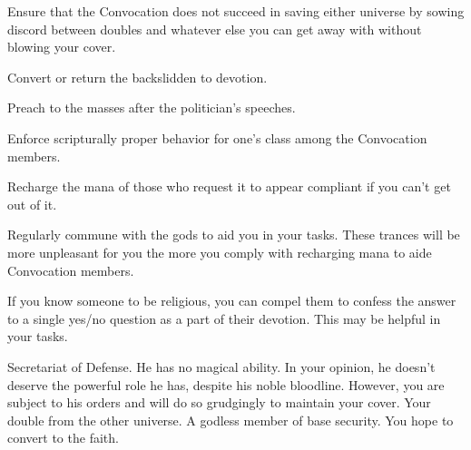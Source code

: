 \documentclass[char]{guildcamp3}
\begin{document}
\begin{itemz}[Goals]
  \item Ensure that the Convocation does not succeed in saving either universe by sowing discord between doubles and whatever else you can get away with without blowing your cover.
  \item Convert or return the backslidden to devotion.
  \item Preach to the masses after the politician's speeches.
  \item Enforce scripturally proper behavior for one's class among the Convocation members.
  \item Recharge the mana of those who request it to appear compliant if you can't get out of it.
  \item Regularly commune with the gods to aid you in your tasks. These trances will be more unpleasant for you the more you comply with recharging mana to aide Convocation members.
\end{itemz}

\begin{itemz}[Notes]
  \item If you know someone to be religious, you can compel them to confess the answer to a single yes/no question as a part of their devotion. This may be helpful in your tasks.
\end{itemz}


\begin{contacts}
  \contact{\cNobleOne{}} Secretariat of Defense. He has no magical ability. In your opinion, he doesn't deserve the powerful role he has, despite his noble bloodline. However, you are subject to his orders and will do so grudgingly to maintain your cover.
  \contact{\cSpecOpTwo{}} Your double from the other universe. A godless member of base security. You hope to convert \cSpecOpTwo{\them} to the faith.
\end{contacts}
\end{document}
